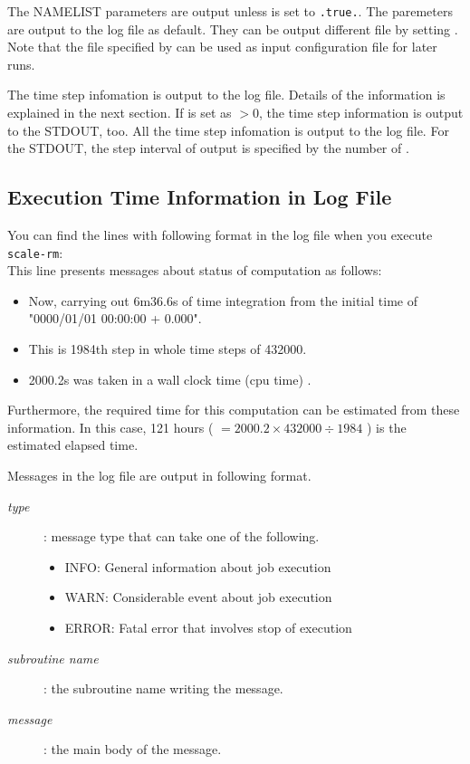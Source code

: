 The NAMELIST parameters are output unless  is set to \verb|.true.|.
The paremeters are output to the log file as default.
They can be output different file by setting .
Note that the file specified by  can be used as input configuration file for later runs.

The time step infomation is output to the log file.
Details of the information is explained in the next section.
If  is set as $>0$, the time step information is output to the STDOUT, too.
All the time step infomation is output to the log file. For the STDOUT, the step interval of output is specified by the number of .



\subsection{Execution Time Information in Log File}

You can find the lines with following format in the log file when you execute \verb|scale-rm|:\\
This line presents messages about status of computation as follows:
\begin{itemize}
 \item Now, carrying out 6m36.6s of time integration from the initial time of "0000/01/01 00:00:00 + 0.000".
 \item This is 1984th step in whole time steps of 432000.
 \item 2000.2s was taken in a wall clock time (cpu time) .
\end{itemize}
Furthermore, the required time for this computation can be estimated from these information.
In this case, 121 hours ( $= 2000.2 \times 432000 \div 1984$ ) is the estimated elapsed time.

\vspace{2ex}
Messages in the log file are output in following format.
\begin{description}
 \item[{\it type}]: message type that can take one of the following.
   \begin{itemize}
    \item INFO: General information about job execution
    \item WARN: Considerable event about job execution
    \item ERROR: Fatal error that involves stop of execution
   \end{itemize}
 \item[{\it subroutine name}]: the subroutine name writing the message.
 \item[{\it message}]: the main body of the message.
\end{description}


